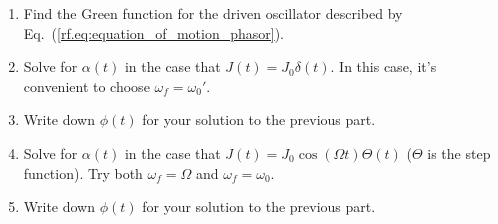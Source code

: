 


\begin{enumerate}[label={(a)}]
  \item Find the Green function for the driven oscillator described by Eq.~(\ref{rf.eq:equation_of_motion_phasor}).
  \item Solve for $\alpha(t)$ in the case that $J(t) = J_0 \delta(t)$. In this case, it's convenient to choose $\omega_f = \omega_0'$.
  \item Write down $\phi(t)$ for your solution to the previous part.
  \item Solve for $\alpha(t)$ in the case that $J(t) = J_0 \cos(\Omega t)\Theta(t)$ ($\Theta$ is the step function). Try both $\omega_f = \Omega$ and $\omega_f = \omega_0$.
  \item Write down $\phi(t)$ for your solution to the previous part.
\end{enumerate}

